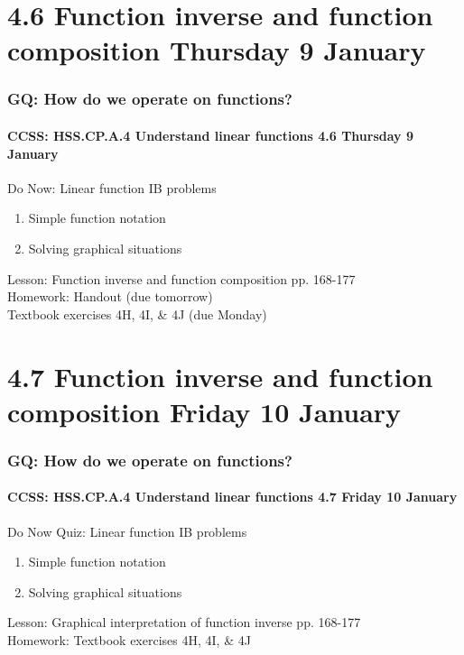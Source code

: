 \documentclass{beamer}
\begin{document}
\section{4.6 Function inverse and function composition Thursday 9 January}
\frame
{
  \frametitle{GQ: How do we operate on functions?}
  \framesubtitle{CCSS: HSS.CP.A.4 Understand linear functions \hfill \alert{4.6 Thursday 9 January}}

  \begin{block}{Do Now: Linear function IB problems}
  \begin{enumerate}
      \item Simple function notation
      \item Solving graphical situations
  \end{enumerate}
  \end{block}
  Lesson: Function inverse and function composition pp. 168-177 \\ \smallskip
  Homework: Handout (due tomorrow)\\
  Textbook exercises 4H, 4I, \& 4J (due Monday)
}

\section{4.7 Function inverse and function composition Friday 10 January}
\frame
{
  \frametitle{GQ: How do we operate on functions?}
  \framesubtitle{CCSS: HSS.CP.A.4 Understand linear functions \hfill \alert{4.7 Friday 10 January}}

  \begin{block}{Do Now Quiz: Linear function IB problems}
  \begin{enumerate}
      \item Simple function notation
      \item Solving graphical situations
  \end{enumerate}
  \end{block}
  Lesson: Graphical interpretation of function inverse pp. 168-177 \\ \smallskip
  Homework: Textbook exercises 4H, 4I, \& 4J
}
\end{document}

